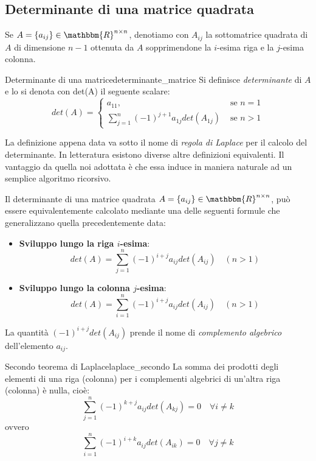 \documentclass[12pt]{report}
\newcounter{theorem}
\newcounter{definition}
\newcommand{\nmu}{}
\begin{document}
\subsection{Determinante di una matrice quadrata}
Se $A = \{a_{ij}\} \in \mathbbm{R}^{n\times n}$, denotiamo con $A_{ij}$ la sottomatrice quadrata di $A$ di dimensione $n-1$ ottenuta da $A$ sopprimendone la $i$-esima riga e la $j$-esima colonna.
\begin{definition}{\nmu Determinante di una matrice}{determinante_matrice}
	Si definisce \textit{determinante} di $A$ e lo si denota con det(A) il seguente scalare:
	\[
	det(A) = \begin{cases}
		a_{11}, &\text{ se }n=1\\
		\displaystyle\sum_{j=1}^{n}(-1)^{j+1}a_{1j}det(A_{1j}) &\text{ se }n>1
	\end{cases}
	\]
\end{definition}
\begin{note}{}{}
La definizione appena data va sotto il nome di \textit{regola di Laplace} per il calcolo del determinante. In letteratura esistono diverse altre definizioni equivalenti. Il vantaggio da quella noi adottata è che essa induce in maniera naturale ad un semplice algoritmo ricorsivo.
\end{note}
Il determinante di una matrice quadrata $A = \{a_{ij}\} \in \mathbbm{R}^{n\times n}$, può essere equivalentemente calcolato mediante una delle seguenti formule che generalizzano quella precedentemente data:
\begin{itemize}
	\item \textbf{Sviluppo lungo la riga $i$-esima}:
	\[
	det(A) = \displaystyle\sum_{j=1}^{n}(-1)^{i+j}a_{ij}det(A_{ij}) \quad (n > 1)
	\]
	\item \textbf{Sviluppo lungo la colonna $j$-esima}:
	\[
	det(A) = \displaystyle\sum_{i=1}^{n}(-1)^{i+j}a_{ij}det(A_{ij}) \quad (n > 1)
	\]
\end{itemize}
\begin{note}{}{}
La quantità $(-1)^{i+j}det(A_{ij})$ prende il nome di \textit{complemento algebrico} dell'elemento $a_{ij}$.
\end{note}
\begin{theorem}{\nmu Secondo teorema di Laplace}{laplace_secondo}
	La somma dei prodotti degli elementi di una riga (colonna) per i complementi algebrici di un'altra riga (colonna) è nulla, cioè:
	\[
	\displaystyle\sum_{j=1}^{n}(-1)^{k+j}a_{ij}det(A_{kj}) = 0 \quad \forall i \neq k
	\]
	ovvero
	\[
	\displaystyle\sum_{i=1}^{n}(-1)^{i+k}a_{ij}det(A_{ik}) = 0 \quad \forall j \neq k
	\]
\end{theorem}
\end{document}

